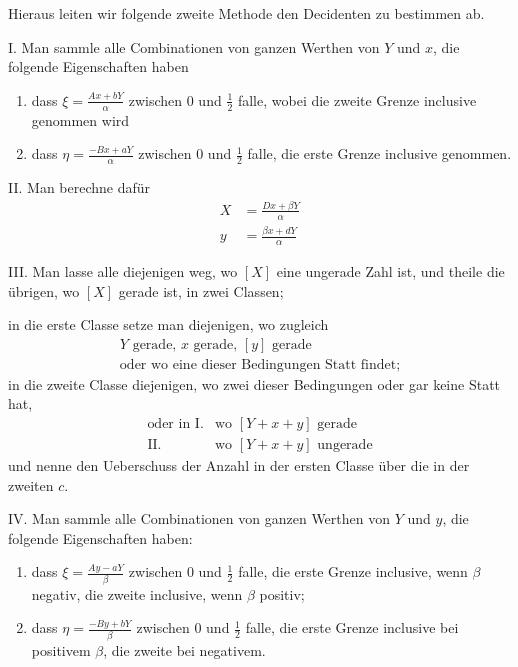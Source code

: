 %
Hieraus leiten wir folgende zweite Methode den Decidenten zu bestimmen ab.

I. Man sammle alle Combinationen von ganzen Werthen von $Y$ und $x$, die folgende Eigenschaften haben
\begin{enumerate}
\item dass $\xi=\frac{Ax+bY}{\alpha}$ zwischen $0$ und $\frac12$ falle, wobei die zweite Grenze inclusive genommen wird
\item dass $\eta=\frac{-Bx+aY}{\alpha}$ zwischen $0$ und $\frac12$ falle, die erste Grenze inclusive genommen.
\end{enumerate}

II. Man berechne dafür
\[
\begin{aligned}
X&=\frac{Dx+\beta Y}{\alpha}\\[3pt]
y&=\frac{\beta x+dY}{\alpha}
\end{aligned}
\]

III. Man lasse alle diejenigen weg, wo $[X]$ eine ungerade Zahl ist, und theile die übrigen, wo $[X]$ gerade ist, in zwei Classen;

in die erste Classe setze man diejenigen, wo zugleich
\[
\begin{array}{l}
Y\text{ gerade, }x\text{ gerade, }[y]\text{ gerade}\\
\text{oder wo eine dieser Bedingungen Statt findet;}
\end{array}
\]
in die zweite Classe diejenigen, wo zwei dieser Bedingungen oder gar keine Statt hat,
\[
\begin{array}{rl}
\text{oder in I.}&\text{wo }[Y+x+y]\text{ gerade}\\
\text{II.}&\text{wo }[Y+x+y]\text{ ungerade}
\end{array}
\]
und nenne den Ueberschuss der Anzahl in der ersten Classe über die in der zweiten $c$.

IV. Man sammle alle Combinationen von ganzen Werthen von $Y$ und $y$, die folgende Eigenschaften haben:
\begin{enumerate}
\item dass $\xi=\frac{Ay-aY}{\beta}$ zwischen $0$ und $\frac12$ falle, die erste Grenze inclusive, wenn $\beta$ negativ, die zweite inclusive, wenn $\beta$ positiv;
\item dass $\eta=\frac{-By+bY}{\beta}$ zwischen $0$ und $\frac12$ falle, die erste Grenze inclusive bei positivem $\beta$, die zweite bei negativem.
\end{enumerate}

